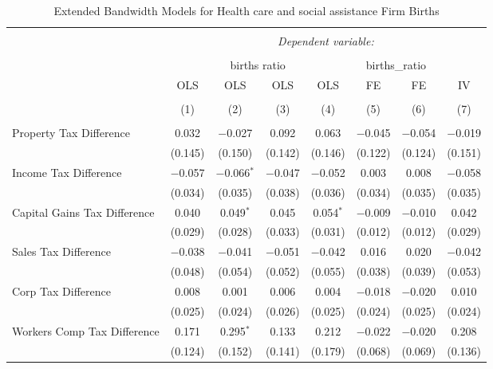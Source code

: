 
\begin{table}[!htbp] \centering 
  \caption{Extended Bandwidth Models for  Health care and social assistance Firm Births} 
  \label{} 
\begin{tabular}{@{\extracolsep{5pt}}lccccccc} 
\\[-1.8ex]\hline 
\hline \\[-1.8ex] 
 & \multicolumn{7}{c}{\textit{Dependent variable:}} \\ 
\cline{2-8} 
\\[-1.8ex] & \multicolumn{4}{c}{births ratio} & \multicolumn{2}{c}{births\_ratio} &   \\ 
 & OLS & OLS & OLS & OLS & FE & FE & IV \\ 
\\[-1.8ex] & (1) & (2) & (3) & (4) & (5) & (6) & (7)\\ 
\hline \\[-1.8ex] 
 Property Tax Difference & 0.032 & $-$0.027 & 0.092 & 0.063 & $-$0.045 & $-$0.054 & $-$0.019 \\ 
  & (0.145) & (0.150) & (0.142) & (0.146) & (0.122) & (0.124) & (0.151) \\ 
  Income Tax Difference & $-$0.057 & $-$0.066$^{*}$ & $-$0.047 & $-$0.052 & 0.003 & 0.008 & $-$0.058 \\ 
  & (0.034) & (0.035) & (0.038) & (0.036) & (0.034) & (0.035) & (0.035) \\ 
  Capital Gains Tax Difference & 0.040 & 0.049$^{*}$ & 0.045 & 0.054$^{*}$ & $-$0.009 & $-$0.010 & 0.042 \\ 
  & (0.029) & (0.028) & (0.033) & (0.031) & (0.012) & (0.012) & (0.029) \\ 
  Sales Tax Difference & $-$0.038 & $-$0.041 & $-$0.051 & $-$0.042 & 0.016 & 0.020 & $-$0.042 \\ 
  & (0.048) & (0.054) & (0.052) & (0.055) & (0.038) & (0.039) & (0.053) \\ 
  Corp Tax Difference & 0.008 & 0.001 & 0.006 & 0.004 & $-$0.018 & $-$0.020 & 0.010 \\ 
  & (0.025) & (0.024) & (0.026) & (0.025) & (0.024) & (0.025) & (0.024) \\ 
  Workers Comp Tax Difference & 0.171 & 0.295$^{*}$ & 0.133 & 0.212 & $-$0.022 & $-$0.020 & 0.208 \\ 
  & (0.124) & (0.152) & (0.141) & (0.179) & (0.068) & (0.069) & (0.136) \\ 

\end{tabular}
\end{table}
